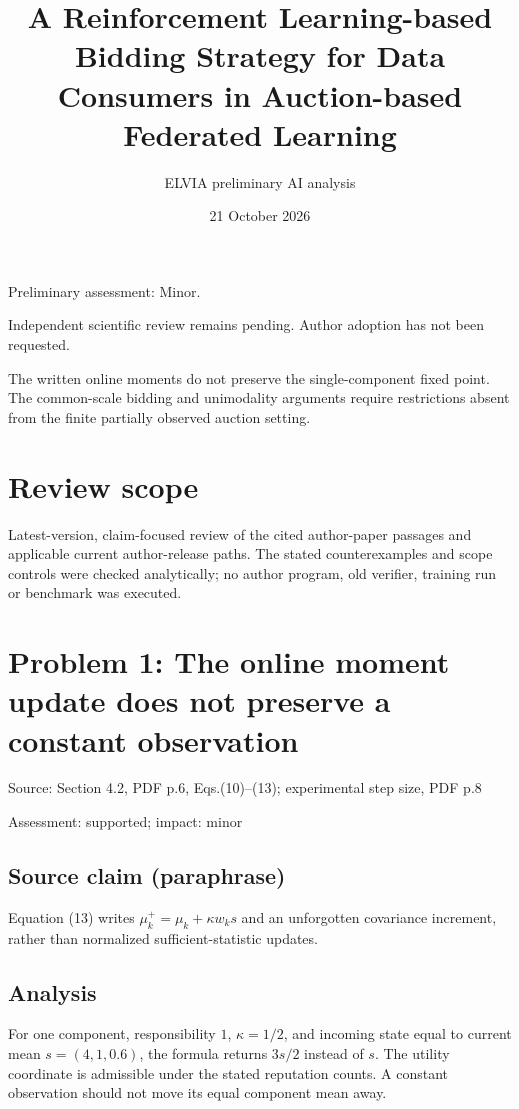 \documentclass[11pt]{article}
\begin{document}
\title{A Reinforcement Learning-based Bidding Strategy for Data Consumers in Auction-based Federated Learning}

\author{ELVIA preliminary AI analysis}\date{21 October 2026}\maketitle

Preliminary assessment: Minor.\par

Independent scientific review remains pending. Author adoption has not been requested.

The written online moments do not preserve the single-component fixed point. The common-scale bidding and unimodality arguments require restrictions absent from the finite partially observed auction setting.

\section*{Review scope}

Latest-version, claim-focused review of the cited author-paper passages and applicable current author-release paths. The stated counterexamples and scope controls were checked analytically; no author program, old verifier, training run or benchmark was executed.

\section*{Problem 1: The online moment update does not preserve a constant observation}

Source: Section 4.2, PDF p.6, Eqs.(10)–(13); experimental step size, PDF p.8

Assessment: supported; impact: minor

\subsection*{Source claim (paraphrase)}

Equation (13) writes \(\mu_k^+=\mu_k+\kappa w_ks\) and an unforgotten covariance increment, rather than normalized sufficient-statistic updates.

\subsection*{Analysis}

For one component, responsibility \(1\), \(\kappa=1/2\), and incoming state equal to current mean \(s=(4,1,0.6)\), the formula returns \(3s/2\) instead of \(s\). The utility coordinate is admissible under the stated reputation counts. A constant observation should not move its equal component mean away.
\end{document}
